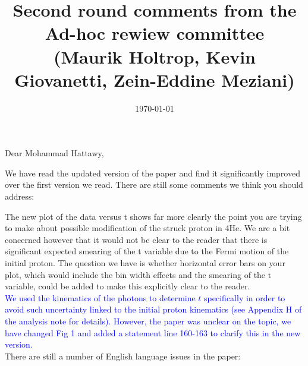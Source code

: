 \documentclass[a4paper,11pt,twoside]{article}
\title{Second round comments from the Ad-hoc rewiew committee \\
 (Maurik Holtrop, Kevin Giovanetti, Zein-Eddine Meziani)}
\date{\today}
\begin{document}
\maketitle

\section*{}

Dear Mohammad Hattawy,

We have read the updated version of the paper and find it significantly 
improved over the first version we read. There are still some comments we think 
you should address:

The new plot of the data versus t shows far more clearly the point you are 
trying to make about possible modification of the struck proton in 4He. We are 
a bit concerned however that it would not be clear to the reader that there is 
significant expected smearing of the t variable due to the Fermi motion of the 
initial proton. The question we have is whether horizontal error bars on your 
plot, which would include the bin width effects and the smearing of the t 
variable, could be added to make this explicitly clear to the reader.\\
   \textcolor{blue}{We used the kinematics of the photons to determine $t$ specifically
   in order to avoid such uncertainty linked to the initial proton kinematics (see 
   Appendix H of the analysis note for details). However, the paper was unclear on 
   the topic, we have changed Fig 1 and added a statement line 160-163 to clarify 
   this in the new version.}\\

There are still a number of English language issues in the paper:\\
\end{document}
